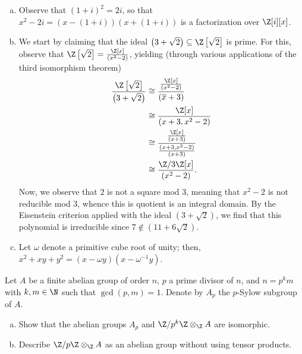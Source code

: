 \documentclass[10pt]{mypackage}
\begin{document}
\begin{solution}\hfill
  \begin{enumerate}[(a)]
    \item Observe that $\left( 1+i \right)^2 = 2i$, so that $x^2 - 2i = \left( x-\left( 1+i \right) \right)\left( x+\left( 1+i \right) \right)$ is a factorization over $\Z[i][x]$.
    \item We start by claiming that the ideal $\left( 3 + \sqrt{2} \right)\subseteq \Z\left[ \sqrt{2} \right]$ is prime. For this, observe that $\Z\left[ \sqrt{2} \right] = \frac{\Z[x]}{\left( x^2-2 \right)}$, yielding (through various applications of the third isomorphism theorem)
      \begin{align*}
        \frac{\Z\left[ \sqrt{2} \right]}{\left( 3 + \sqrt{2} \right)} &\cong \frac{\frac{\Z[x]}{\left( x^2-2 \right)}}{\left( \overline{x}+3 \right)}\\
                                                                      &\cong \frac{\Z[x]}{\left( x+3,x^2-2 \right)}\\
                                                                      &\cong \frac{\frac{\Z[x]}{\left( x+3 \right)}}{\frac{\left( x+3,x^2-2 \right)}{\left( x+3 \right)}}\\
                                                                      &\cong \frac{\Z/3\Z[x]}{\left( x^2-2 \right)}.
      \end{align*}
      Now, we observe that $2$ is not a square mod $3$, meaning that $x^2-2$ is not reducible mod $3$, whence this is quotient is an integral domain. By the Eisenstein criterion applied with the ideal $\left( 3 + \sqrt{2} \right)$, we find that this polynomial is irreducible since $7\notin \left( 11 + 6\sqrt{2} \right)$.
    \item Let $\omega$ denote a primitive cube root of unity; then, $x^2 + xy + y^2 = \left( x-\omega y \right)\left( x-\omega^{-1}y \right)$.
  \end{enumerate}
\end{solution}
\begin{problem}[Problem 4]
  Let $A$ be a finite abelian group of order $n$, $p$ a prime divisor of $n$, and $n = p^{k}m$ with $k,m\in \N$ such that $\gcd\left( p,m \right) = 1$. Denote by $A_p$ the $p$-Sylow subgroup of $A$.
  \begin{enumerate}[(a)]
    \item Show that the abelian groups $A_p$ and $\Z/p^{k}\Z\otimes_{\Z}A$ are isomorphic.
    \item Describe $\Z/p\Z\otimes_{\Z}A$ as an abelian group without using tensor products.
  \end{enumerate}
\end{problem}
\end{document}
